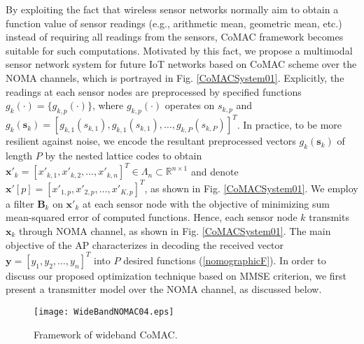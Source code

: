 \documentclass[journal]{IEEEtran}
\theoremstyle{definition}
\begin{document}
		By exploiting the fact that wireless sensor networks normally aim to obtain a function value of sensor readings (e.g., arithmetic mean, geometric mean, etc.) instead of requiring all readings from the sensors, CoMAC framework becomes suitable for such computations. Motivated by this fact, we propose a multimodal sensor network system for future IoT networks based on CoMAC scheme over the NOMA channels, which is portrayed in Fig. \ref{CoMACSystem01}. Explicitly, the readings at each sensor nodes are preprocessed by specified functions $g_k(\cdot) =\{ g_{k,p}(\cdot)\}$, where $g_{k,p}(\cdot)$ operates on $s_{k,p}$ and $g_k(\mathbf{s}_k) = [g_{k,1}(s_{k,1}),g_{k,1}(s_{k,1}),\dots, g_{k,P}(s_{k,P})]^T $. In practice, to be more resilient against noise, we encode the resultant preprocessed vectors $g_k(\mathbf{s}_k)$ of length $P$ by the nested lattice codes to obtain $\mathbf{x}'_k =[x'_{k,1}, x'_{k,2},\dots, x'_{k,n}]^T  \in \Lambda_n \subset \mathbb{R}^{n\times 1}$  \cite{Gaspar2011} and denote $\mathbf{x}'[p] = [x'_{1,p}, x'_{2,p},\dots, x'_{K,p}]^T$, as shown in Fig. \ref{CoMACSystem01}. We employ a filter $\mathbf{B}_k$ on $\mathbf{x}'_k$ at each sensor node with the objective of minimizing sum mean-squared error of computed functions. Hence, each sensor node $k$ transmits $\mathbf{x}_k$ through NOMA channel, as shown in Fig. \ref{CoMACSystem01}. The main objective of the AP characterizes in decoding the received vector $\mathbf{y} =[y_{1}, y_{2},\dots, y_{n}]^T$ into $P$ desired functions (\ref{nomographicF}). In order to discuss our proposed optimization technique based on MMSE criterion, we first present a transmitter model over the NOMA channel, as discussed below. 
		\vspace{-0.4cm}
		
			\begin{center}
		\begin{figure*}
			\centering
			\texttt{[image: WideBandNOMAC04.eps]}
			\centering \caption{Framework of wideband CoMAC.} \label{CoMAC01}
			\vspace{-0.2cm}
		\end{figure*}
	\end{center}
	
	\vspace{-0.4cm}
	
\end{document}
